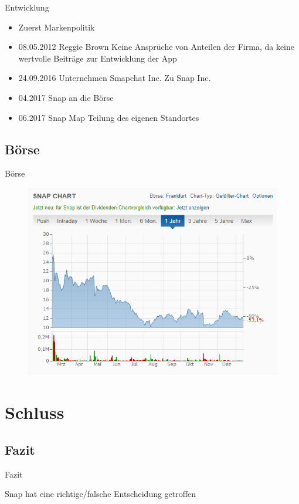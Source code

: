 \documentclass{beamer}
\begin{document}
\begin{frame} {Entwicklung}
\begin{itemize}
\item Zuerst Markenpolitik \pause
\item  08.05.2012 Reggie Brown Keine Ansprüche von Anteilen der Firma, da keine wertvolle Beiträge zur Entwicklung der App \pause
\item  24.09.2016 Unternehmen Smapchat Inc. Zu Snap Inc. \pause
\item  04.2017 Snap an die Börse \pause
\item 06.2017 Snap Map Teilung des eigenen Standortes \pause

\end{itemize}
\end{frame}

\subsection{Börse}
\begin{frame}{Börse}
\begin{figure}
	\includegraphics[width=0.7\linewidth]{SnapAktie.png}
\end{figure}
\end{frame}


\section{Schluss}
\subsection{Fazit}
\begin{frame}{Fazit}

Snap hat eine richtige/falsche Entscheidung getroffen

\end{frame}
\end{document}
